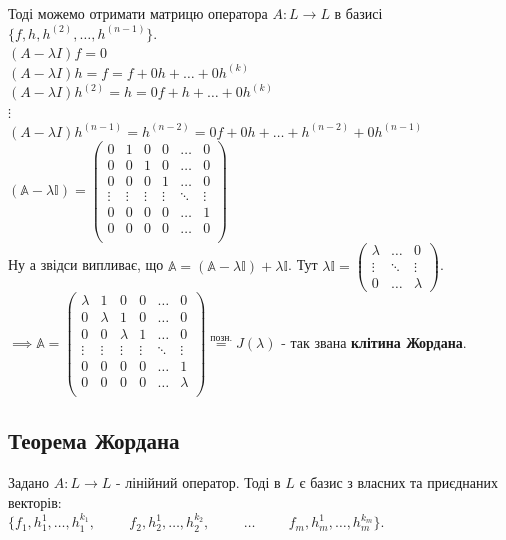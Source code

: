 Тоді можемо отримати матрицю оператора $A: L \to L$ в базисі $\{f,h,h^{(2)},\dots,h^{(n-1)}\}$.\\
$(A-\lambda I)f = 0$\\
$(A-\lambda I)h = f = f + 0h + \dots + 0h^{(k)}$\\
$(A-\lambda I)h^{(2)} = h = 0f + h + \dots + 0h^{(k)}$\\
$\vdots$\\
$(A-\lambda I)h^{(n-1)} = h^{(n-2)} = 0f + 0h + \dots + h^{(n-2)} + 0h^{(n-1)}$\\
$(\mathbb{A}- \lambda \mathbb{I}) = \begin{pmatrix}
0 & 1 & 0 & 0 & \dots & 0 \\
0 & 0 & 1 & 0 & \dots & 0 \\
0 & 0 & 0 & 1 & \dots & 0 \\
\vdots & \vdots & \vdots & \vdots & \ddots & \vdots \\
0 & 0 & 0 & 0 & \dots & 1 \\
0 & 0 & 0 & 0 & \dots & 0 \\
\end{pmatrix}$\\
Ну а звідси випливає, що $\mathbb{A} = (\mathbb{A} - \lambda \mathbb{I}) + \lambda \mathbb{I}$. Тут $\lambda \mathbb{I} = \begin{pmatrix}
\lambda & \dots & 0\\
\vdots & \ddots & \vdots\\
0 & \dots & \lambda
\end{pmatrix}$.\\
$\implies \mathbb{A} = \begin{pmatrix}
\lambda & 1 & 0 & 0 & \dots & 0 \\
0 & \lambda & 1 & 0 & \dots & 0 \\
0 & 0 & \lambda & 1 & \dots & 0 \\
\vdots & \vdots & \vdots & \vdots & \ddots & \vdots \\
0 & 0 & 0 & 0 & \dots & 1 \\
0 & 0 & 0 & 0 & \dots & \lambda \\
\end{pmatrix} \overset{\textrm{позн.}}{=} J(\lambda)$ - так звана \textbf{клітина Жордана}.

\subsection{Теорема Жордана}
\begin{theorem}
Задано $A: L \to L$ - лінійний оператор. Тоді в $L$ є базис з власних та приєднаних векторів:\\
$\{f_1, h_1^1, \dots ,h_1^{k_1}, \hspace{1cm} f_2, h_2^1, \dots, h_2^{k_2}, \hspace{1cm} \dots \hspace{1cm} f_m, h_m^{1}, \dots, h_m^{k_m}\}$.
\end{theorem}

